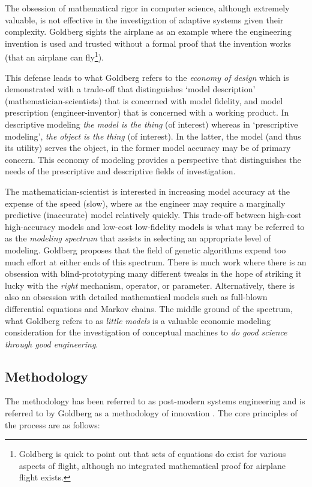 \documentclass[a4paper, 11pt]{article}
\begin{document}
The obsession of mathematical rigor in computer science, although extremely valuable, is not effective in the investigation of adaptive systems given their complexity. Goldberg sights the airplane as an example where the engineering invention is used and trusted without a formal proof that the invention works (that an airplane can fly\footnote{Goldberg is quick to point out that sets of equations do exist for various aspects of flight, although no integrated mathematical proof for airplane flight exists.}). 

This defense leads to what Goldberg refers to the \emph{economy of design} which is demonstrated with a trade-off that distinguishes `model description' (mathematician-scientists) that is concerned with model fidelity, and model prescription (engineer-inventor) that is concerned with a working product. In descriptive modeling \emph{the model is the thing} (of interest) whereas in `prescriptive modeling', \emph{the object is the thing} (of interest). In the latter, the model (and thus its utility) serves the object, in the former model accuracy may be of primary concern. This economy of modeling provides a perspective that distinguishes the needs of the prescriptive and descriptive fields of investigation. 

The mathematician-scientist is interested in increasing model accuracy at the expense of the speed (slow), where as the engineer may require a marginally predictive (inaccurate) model relatively quickly. This trade-off between high-cost high-accuracy models and low-cost low-fidelity models is what may be referred to as the \emph{modeling spectrum} that assists in selecting an appropriate level of modeling. Goldberg proposes that the field of genetic algorithms expend too much effort at either ends of this spectrum. There is much work where there is an obsession with blind-prototyping many different tweaks in the hope of striking it lucky with the \emph{right} mechanism, operator, or parameter. Alternatively, there is also an obsession with detailed mathematical models such as full-blown differential equations and Markov chains. The middle ground of the spectrum, what Goldberg refers to as \emph{little models} is a valuable economic modeling consideration for the investigation of conceptual machines to \emph{do good science through good engineering}. 

\subsection{Methodology}
The methodology has been referred to as post-modern systems engineering and is referred to by Goldberg as a methodology of innovation \cite{Goldberg2004}. The core principles of the process are as follows: 
\end{document}
